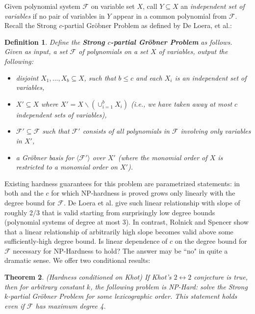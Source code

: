 \documentclass{article}
\newtheorem{theorem}{Theorem}[]
\newtheorem{definition}[theorem]{Definition}
\begin{document}
Given polynomial system $\mathcal{F}$ on variable set $X$, call $Y\subseteq X$  an \textit{independent set of variables} if no pair of variables in $Y$ appear in a common polynomial from $\mathcal{F}$.
Recall the Strong $c$-partial Gr\"{o}bner Problem as defined by De Loera, et al.:

\begin{definition} \citep{deloera}
Define the \textbf{Strong $c$-partial Gr\"{o}bner Problem} as follows. Given as input, a set $\mathcal{F}$ of polynomials on a set $X$ of variables, output the following:
\begin{itemize}
\item disjoint $X_1,...,X_b\subseteq X$, such that $b\leq c$ and each $X_i$ is an independent set of variables,
\item $X'\subseteq X$ where $X'=X\backslash (\cup_{i=1}^b X_i)$ (i.e., we have taken away at most $c$ independent sets of variables),
\item $\mathcal{F}'\subseteq\mathcal{F}$ such that $\mathcal{F}'$ consists of all polynomials in $\mathcal{F}$ involving only variables in $X'$,
\item a Gr\"{o}bner basis for $\langle \mathcal{F}'\rangle$ over $X'$ (where the monomial order of $X$ is restricted to a monomial order on $X'$).
\end{itemize}
\end{definition}


Existing hardness guarantees for this problem are parametrized statements: in both \citep{deloera} and \citep{RS} the $c$ for which NP-hardness is proved grows only linearly with the degree bound for $\mathcal{F}$. De Loera et al. give such linear relationship with slope of roughly 2/3 that is valid starting from surprisingly low degree bounds (polynomial systems of degree at most 3). In contrast, Rolnick and Spencer show that a linear relationship of arbitrarily high slope becomes valid above some sufficiently-high degree bound. Is linear dependence of $c$ on the degree bound for $\mathcal{F}$ necessary for NP-Hardness to hold? The answer may be ``no" in quite a dramatic sense. We offer two conditional results:

\begin{theorem} \label{Khotcond}(Hardness conditioned on Khot)
If Khot's $2\leftrightarrow 2$ conjecture is true, then for arbitrary constant $k$, the following problem is NP-Hard:
solve the Strong $k$-partial Gr\"{o}bner Problem for some lexicographic order.
This statement holds even if $\mathcal{F}$ has maximum degree 4.
\end{theorem}
\end{document}
